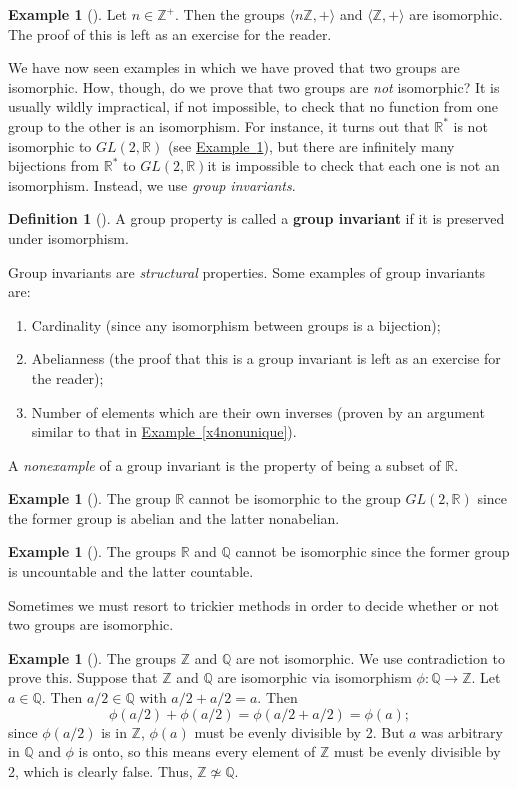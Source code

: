 \documentclass[10pt,]{book}
\newcommand{\terminology}[1]{\textbf{#1}}
\theoremstyle{plain}
\theoremstyle{definition}
\newtheorem{definition}[theorem]{Definition}
\theoremstyle{definition}
\theoremstyle{definition}
\newtheorem{example}[theorem]{Example}
\theoremstyle{definition}
\numberwithin{equation}{section}
\def\Z{\mathbb{Z}}
\def\R{\mathbb{R}}
\def\Q{\mathbb{Q}}
\begin{document}
\begin{example}[]\label{example-29}
Let \(n\in \Z^+\). Then the groups \(\langle n\Z,+\rangle\) and \(\langle \Z,+\rangle\) are isomorphic. The proof of this is left as an exercise for the reader.%
\end{example}
We have now seen examples in which we have proved that two groups are isomorphic. How, though, do we prove that two groups are \emph{not} isomorphic? It is usually wildly impractical, if not impossible, to check that no function from one group to the other is an isomorphism. For instance, it turns out that \(\R^*\) is not isomorphic to \(GL(2,\R)\) (see \hyperref[rgl]{Example~\ref{rgl}}), but there are infinitely many bijections from \(\R^*\) to \(GL(2,\R)\)\textemdash{}it is impossible to check that each one is not an isomorphism. Instead, we use \emph{group invariants}.%
\begin{definition}[{}]\label{definition-36}
A group property is called a \terminology{group invariant} if it is preserved under isomorphism.%
\end{definition}
Group invariants are \emph{structural} properties. Some examples of group invariants are: \leavevmode%
\begin{enumerate}
\item\hypertarget{li-155}{}Cardinality (since any isomorphism between groups is a bijection);%
\item\hypertarget{li-156}{}Abelianness (the proof that this is a group invariant is left as an exercise for the reader);%
\item\hypertarget{li-157}{}Number of elements which are their own inverses (proven by an argument similar to that in \hyperref[x4nonunique]{Example~\ref{x4nonunique}}).%
\end{enumerate}
%
\par
A \emph{nonexample} of a group invariant is the property of being a subset of \(\R\).%
\begin{example}[]\label{rgl}
The group \(\R\) cannot be isomorphic to the group \(GL(2,\R)\) since the former group is abelian and the latter nonabelian.%
\end{example}
\begin{example}[]\label{example-31}
The groups \(\R\) and \(\Q\) cannot be isomorphic since the former group is uncountable and the latter countable.%
\end{example}
Sometimes we must resort to trickier methods in order to decide whether or not two groups are isomorphic.%
\begin{example}[]\label{zq}
The groups \(\Z\) and \(\Q\) are not isomorphic. We use contradiction to prove this. Suppose that \(\Z\) and \(\Q\) are isomorphic via isomorphism \(\phi :\Q \to \Z\). Let \(a\in \Q\). Then \(a/2 \in \Q\) with \(a/2 + a/2 =a\). Then%
\begin{equation*}
\phi(a/2)+\phi(a/2)=\phi(a/2+a/2)=\phi(a);
\end{equation*}
since \(\phi(a/2)\) is in \(\Z\), \(\phi(a)\) must be evenly divisible by 2. But \(a\) was arbitrary in \(\Q\) and \(\phi\) is onto, so this means every element of \(\Z\) must be evenly divisible by 2, which is clearly false. Thus, \(\Z\not\simeq \Q\).%
\end{example}
\end{document}

